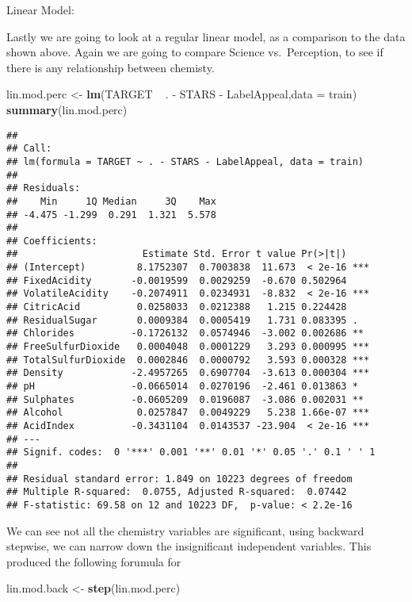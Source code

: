 \documentclass[]{article}
\newenvironment{Shaded}{\begin{snugshade}}{\end{snugshade}}
\newcommand{\KeywordTok}[1]{\textcolor[rgb]{0.13,0.29,0.53}{\textbf{{#1}}}}
\newcommand{\DataTypeTok}[1]{\textcolor[rgb]{0.13,0.29,0.53}{{#1}}}
\newcommand{\StringTok}[1]{\textcolor[rgb]{0.31,0.60,0.02}{{#1}}}
\newcommand{\NormalTok}[1]{{#1}}
\begin{document}
Linear Model:

Lastly we are going to look at a regular linear model, as a comparison
to the data shown above. Again we are going to compare Science
vs.~Perception, to see if there is any relationship between chemisty.

\begin{Shaded}
\begin{Highlighting}[]
\NormalTok{lin.mod.perc <-}\StringTok{ }\KeywordTok{lm}\NormalTok{(TARGET ~}\StringTok{ }\NormalTok{. -}\StringTok{ }\NormalTok{STARS -}\StringTok{ }\NormalTok{LabelAppeal,}\DataTypeTok{data =} \NormalTok{train) }
\KeywordTok{summary}\NormalTok{(lin.mod.perc)}
\end{Highlighting}
\end{Shaded}

\begin{verbatim}
## 
## Call:
## lm(formula = TARGET ~ . - STARS - LabelAppeal, data = train)
## 
## Residuals:
##    Min     1Q Median     3Q    Max 
## -4.475 -1.299  0.291  1.321  5.578 
## 
## Coefficients:
##                      Estimate Std. Error t value Pr(>|t|)    
## (Intercept)         8.1752307  0.7003838  11.673  < 2e-16 ***
## FixedAcidity       -0.0019599  0.0029259  -0.670 0.502964    
## VolatileAcidity    -0.2074911  0.0234931  -8.832  < 2e-16 ***
## CitricAcid          0.0258033  0.0212388   1.215 0.224428    
## ResidualSugar       0.0009384  0.0005419   1.731 0.083395 .  
## Chlorides          -0.1726132  0.0574946  -3.002 0.002686 ** 
## FreeSulfurDioxide   0.0004048  0.0001229   3.293 0.000995 ***
## TotalSulfurDioxide  0.0002846  0.0000792   3.593 0.000328 ***
## Density            -2.4957265  0.6907704  -3.613 0.000304 ***
## pH                 -0.0665014  0.0270196  -2.461 0.013863 *  
## Sulphates          -0.0605209  0.0196087  -3.086 0.002031 ** 
## Alcohol             0.0257847  0.0049229   5.238 1.66e-07 ***
## AcidIndex          -0.3431104  0.0143537 -23.904  < 2e-16 ***
## ---
## Signif. codes:  0 '***' 0.001 '**' 0.01 '*' 0.05 '.' 0.1 ' ' 1
## 
## Residual standard error: 1.849 on 10223 degrees of freedom
## Multiple R-squared:  0.0755, Adjusted R-squared:  0.07442 
## F-statistic: 69.58 on 12 and 10223 DF,  p-value: < 2.2e-16
\end{verbatim}

We can see not all the chemistry variables are significant, using
backward stepwise, we can narrow down the insignificant independent
variables. This produced the following forumula for

\begin{Shaded}
\begin{Highlighting}[]
\NormalTok{lin.mod.back <-}\StringTok{ }\KeywordTok{step}\NormalTok{(lin.mod.perc)}
\end{Highlighting}
\end{Shaded}
\end{document}
